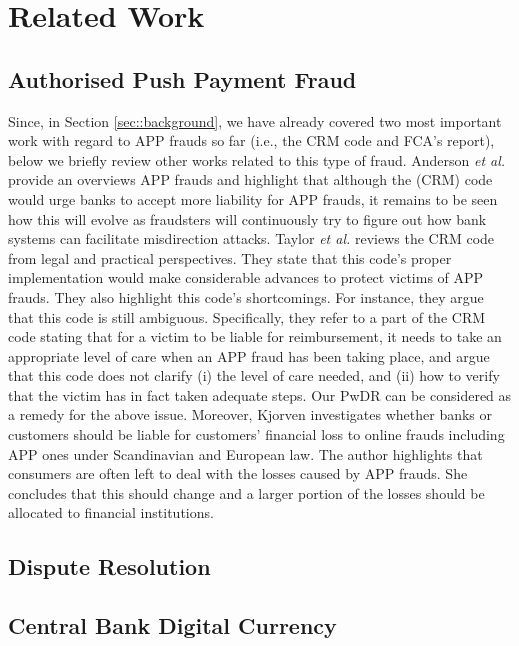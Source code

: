 
\section{Related Work}


\subsection{Authorised Push Payment Fraud}

Since, in Section \ref{sec::background}, we have already covered two most important work  with regard to APP frauds so far (i.e.,  the CRM code and FCA's  report), below we briefly  review other works related to this type of fraud. Anderson \textit{et al.} \cite{anderson2019measuring} provide an overviews APP frauds and highlight that although  the (CRM) code would urge  banks to accept more liability for APP frauds, it remains to be seen how this will evolve as   fraudsters will continuously try to figure out how bank systems can facilitate misdirection attacks. Taylor \textit{et al.} \cite{taylor2020new} reviews the CRM code from legal and practical perspectives. They  state that this code's proper implementation would make considerable advances to protect victims of APP frauds. They also highlight this code's shortcomings. For instance, they argue that this code is still ambiguous. Specifically, they refer to a part of the  CRM code  stating that for a victim to be liable for reimbursement,  it needs to take an appropriate level of  care when an APP fraud has been taking place, and argue that   this  code does not  clarify (i)  the level of care needed,  and (ii) how to verify that the victim has in fact taken adequate steps. Our PwDR  can be considered as a remedy for the above issue.   Moreover, Kjorven \cite{kjorven2020pays} investigates whether banks or customers should be liable for customers' financial loss to online  frauds including APP ones under Scandinavian and European law. The author highlights  that consumers are often left to deal with the losses caused by APP frauds. She concludes that this should change and  a larger portion of the losses should be allocated to financial institutions.


\subsection{Dispute Resolution}


\subsection{Central Bank Digital Currency}

